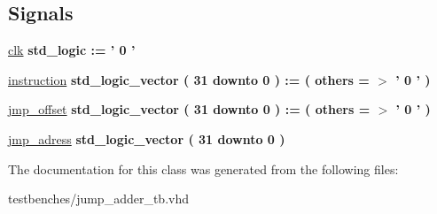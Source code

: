 \subsection*{\-Signals}
 \begin{DoxyCompactItemize}
\item 
\hypertarget{classjump__adder__tb_1_1behavior_abac182a083cb1fbdec9988ea49b83305}{\hyperlink{classjump__adder__tb_1_1behavior_abac182a083cb1fbdec9988ea49b83305}{clk} {\bfseries std\-\_\-logic  \-:= '  0  ' } }\label{classjump__adder__tb_1_1behavior_abac182a083cb1fbdec9988ea49b83305}

\item 
\hypertarget{classjump__adder__tb_1_1behavior_a6a7e83159e031a9cd68e875f93591ab2}{\hyperlink{classjump__adder__tb_1_1behavior_a6a7e83159e031a9cd68e875f93591ab2}{instruction} {\bfseries std\-\_\-logic\-\_\-vector (   31    downto    0  )  \-:= (  others  = $>$ '  0  '  ) } }\label{classjump__adder__tb_1_1behavior_a6a7e83159e031a9cd68e875f93591ab2}

\item 
\hypertarget{classjump__adder__tb_1_1behavior_a00dfa7e780d02a4939d1f6ed4a60541b}{\hyperlink{classjump__adder__tb_1_1behavior_a00dfa7e780d02a4939d1f6ed4a60541b}{jmp\-\_\-offset} {\bfseries std\-\_\-logic\-\_\-vector (   31    downto    0  )  \-:= (  others  = $>$ '  0  '  ) } }\label{classjump__adder__tb_1_1behavior_a00dfa7e780d02a4939d1f6ed4a60541b}

\item 
\hypertarget{classjump__adder__tb_1_1behavior_afb052939be0f788cfe696c87ec9a06d9}{\hyperlink{classjump__adder__tb_1_1behavior_afb052939be0f788cfe696c87ec9a06d9}{jmp\-\_\-adress} {\bfseries std\-\_\-logic\-\_\-vector (   31    downto    0  ) } }\label{classjump__adder__tb_1_1behavior_afb052939be0f788cfe696c87ec9a06d9}

\end{DoxyCompactItemize}


\-The documentation for this class was generated from the following files\-:\begin{DoxyCompactItemize}
\item 
testbenches/jump\-\_\-adder\-\_\-tb.\-vhd\end{DoxyCompactItemize}
